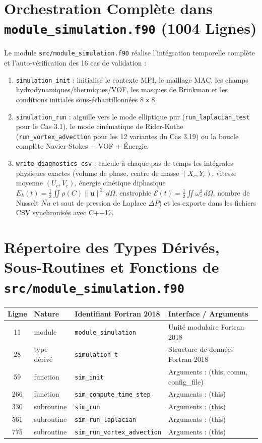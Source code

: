 \documentclass[10pt,a4paper,oneside]{book}
\begin{document}
\section{Orchestration Complète dans \texttt{module\_simulation.f90} (1004 Lignes)}
Le module \texttt{src/module\_simulation.f90} réalise l'intégration temporelle complète et l'auto-vérification des 16 cas de validation :
\begin{enumerate}
  \item \texttt{simulation\_init} : initialise le contexte MPI, le maillage MAC, les champs hydrodynamiques/thermiques/VOF, les masques de Brinkman et les conditions initiales sous-échantillonnées $8\times 8$.
  \item \texttt{simulation\_run} : aiguille vers le mode elliptique pur (\texttt{run\_laplacian\_test} pour le Cas 3.1), le mode cinématique de Rider-Kothe (\texttt{run\_vortex\_advection} pour les 12 variantes du Cas 3.19) ou la boucle complète Navier-Stokes + VOF + Énergie.
  \item \texttt{write\_diagnostics\_csv} : calcule à chaque pas de temps les intégrales physiques exactes (volume de phase, centre de masse $(X_c, Y_c)$, vitesse moyenne $(U_c, V_c)$, énergie cinétique diphasique $E_k(t) = \frac{1}{2}\iint \rho(C)\|\mathbf{u}\|^2\,d\Omega$, enstrophie $\mathcal{E}(t) = \frac{1}{2}\iint \omega_z^2\,d\Omega$, nombre de Nusselt $\overline{Nu}$ et saut de pression de Laplace $\Delta P$) et les exporte dans les fichiers CSV synchronisés avec C++17.
\end{enumerate}

\section{Répertoire des Types Dérivés, Sous-Routines et Fonctions de \texttt{src/module\_simulation.f90}}
\begin{center}\small
\begin{tabular}{clll}
\toprule
\textbf{Ligne} & \textbf{Nature} & \textbf{Identifiant Fortran 2018} & \textbf{Interface / Arguments} \\
\midrule
11 & module & \texttt{module\_simulation} & Unité modulaire Fortran 2018 \\
28 & type dérivé & \texttt{simulation\_t} & Structure de données Fortran 2018 \\
59 & function & \texttt{sim\_init} & Arguments : (this, comm, config\_file) \\
266 & function & \texttt{sim\_compute\_time\_step} & Arguments : (this) \\
330 & subroutine & \texttt{sim\_run} & Arguments : (this) \\
561 & subroutine & \texttt{sim\_run\_laplacian} & Arguments : (this) \\
775 & subroutine & \texttt{sim\_run\_vortex\_advection} & Arguments : (this) \\
\bottomrule
\end{tabular}
\end{center}
\end{document}
